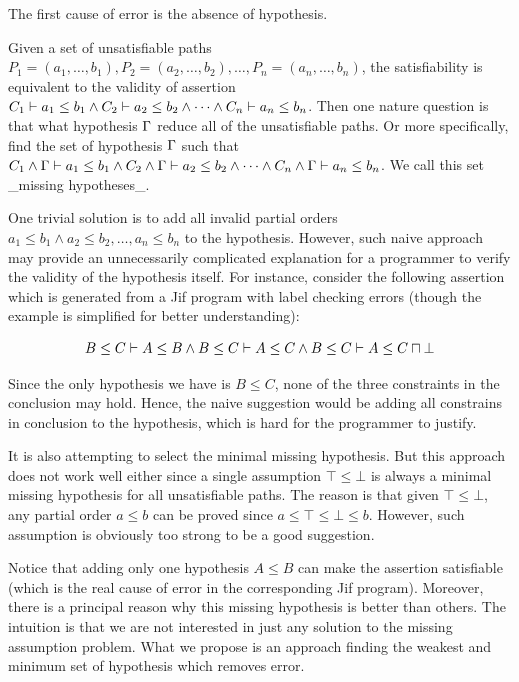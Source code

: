 The first cause of error is the absence of hypothesis.

Given a set of unsatisfiable paths $P_1 = (a_1, \dots, b_1), P_2 = (a_2, \dots,
b_2), \dots,  P_n = (a_n, \dots, b_n)$, the satisfiability is
equivalent to the validity of assertion $C_1 \vdash a_1 \leq b_1
\land C_2 \vdash a_2 \leq b_2 \land \dots \land C_n \vdash a_n \leq
b_n$. Then one nature question is that what hypothesis $\Gamma$ reduce all
of the unsatisfiable paths. Or more specifically, find the set of
hypothesis $\Gamma$ such that 
%
$C_1 \land \Gamma \vdash a_1 \leq b_1 \land C_2 \land \Gamma \vdash a_2 \leq
b_2 \land \dots \land C_n \land \Gamma \vdash a_n \leq b_n$. 
%
We call this set _missing hypotheses_.

One trivial solution is to add all invalid partial orders $a_1\leq b_1
\land a_2\leq b_2, \dots, a_n\leq b_n$ to the hypothesis.  However,
such naive approach may provide an unnecessarily complicated
explanation for a programmer to verify the validity of the hypothesis
itself. 
%
For instance, consider the following assertion which is generated from
a Jif program with label checking errors (though the example is
simplified for better understanding): 

\[B\leq C \vdash A\leq B \land B\leq C \vdash A\leq C \land B\leq C
\vdash A\leq C\sqcap \bot \]

Since the only hypothesis we have is $B\leq C$, none of the three constraints
in the conclusion may hold. Hence, the naive suggestion would be adding all
constrains in conclusion to the hypothesis, which is hard for the
programmer to justify.

It is also attempting to select the minimal missing hypothesis. But
this approach does not work well either since a single assumption
$\top\leq \bot$ is always a minimal missing hypothesis for all
unsatisfiable paths. The reason is that given $\top\leq \bot$, any
partial order $a \leq b$ can be proved since $a\leq \top\leq \bot\leq
b$. However, such assumption is obviously too strong to be a good
suggestion.

Notice that adding only one hypothesis $A\leq B$ can make the
assertion satisfiable (which is the real cause of error in the
corresponding Jif program). Moreover, there is a principal reason why
this missing hypothesis is better than others.
%
The intuition is that we are not interested in just any solution to
the missing assumption problem. What we propose is an approach finding
the weakest and minimum set of hypothesis which removes error.

